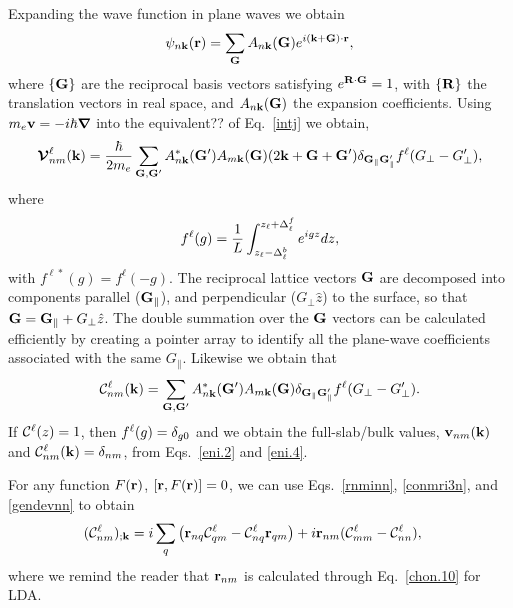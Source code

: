 \documentclass[floatfix,prb,aps,superscriptaddress,11pt,preprint,letterpaper]{revtex4}
\begin{document}
Expanding the wave function in plane waves we obtain
\begin{align}\label{eni.1}
\psi_{n\mathbf{k}}(\mathbf{r})=\sum_{\mathbf{G}} A_{n\mathbf{k}}(\mathbf{G})e^{i(\mathbf{k}+\mathbf{G})\cdot\mathbf{r}}
,
\end{align}
where $\{\mathbf{G}\}$ are the reciprocal basis vectors satisfying
$e^{\mathbf{R}\cdot\mathbf{G}}=1$, with $\{\mathbf{R}\}$ the translation vectors in real
space, and $A_{n\mathbf{k}}(\mathbf{G})$ {\color{red} the} expansion coefficients. Using
$m_e\mathbf{v}=-i\hbar\boldsymbol{\nabla}$ into the {\color{red} equivalent??} 
of Eq.~\eqref{intj}
we obtain,\cite{mendozaPRB06}
\begin{align}\label{eni.2}
\boldsymbol{\mathcal{\cal V}}^\ell_{nm}(\mathbf{k})=
\frac{\hbar}{2m_e}
\sum_{\mathbf{G},\mathbf{G}'} A^*_{n\mathbf{k}}(\mathbf{G}')  A_{m\mathbf{k}}(\mathbf{G})
(2\mathbf{k}+\mathbf{G}+\mathbf{G}')
\delta_{\mathbf{G}_\parallel \mathbf{G}'_\parallel}  
f^\ell(G_\perp-G'_\perp)
,
\end{align}   
where
\begin{align}\label{vnl.9}
f^\ell(g)=\frac{1}{L}\int_{z_\ell-\Delta^b_\ell}^{z_\ell+\Delta^f_\ell} e^{igz}dz  
 ,
\end{align}
with $f^{\ell*}(g)=f^\ell(-g)$. 
{\color{red} The} reciprocal lattice vectors $\mathbf{G}$ are 
decomposed into components
{\color{red} parallel ($\mathbf{G}_\parallel$), and perpendicular ($G_\perp \hat z$)} 
to the surface, so
that $\mathbf{G} = \mathbf{G}_\parallel + G_\perp\hat z$.
The double summation over the $\mathbf{G}$ vectors can be 
{\color{red} calculated efficiently} by  
creating a pointer array to identify all the plane-wave coefficients  
associated with the same $G_\parallel$.  
Likewise we obtain that
\begin{align}\label{eni.4}
{\mathbf{\cal C}}^\ell_{nm}(\mathbf{k})=
\sum_{\mathbf{G},\mathbf{G}'} A^*_{n\mathbf{k}}(\mathbf{G}')  A_{m\mathbf{k}}(\mathbf{G})
\delta_{\mathbf{G}_\parallel \mathbf{G}'_\parallel} 
f^\ell(G_\perp-G'_\perp)
.
\end{align}  
If ${\mathbf{\cal C}}^\ell(z)=1$, {\color{red} then $f^\ell(g)=\delta_{g0}$ and we 
obtain the full-slab/bulk values, 
$\mathbf{v}_{nm}(\mathbf{k})$ and ${\mathbf{\cal C}}^\ell_{nm}(\mathbf{k})=\delta_{nm}$,
from Eqs.~\eqref{eni.2} and \eqref{eni.4}}.

{\color{red} For} any function $F(\mathbf{r})$, $[\mathbf{r},F(\mathbf{r})]=0$, 
{\color{red} we can use}
Eqs.~\eqref{rnminn}, \eqref{conmri3n}, and \eqref{gendevnn} 
{\color{red} to }obtain
\begin{align} 
({\mathbf{\cal C}}^\ell_{nm})_{;\mathbf{k}}
&=
i
\sum_{q} 
 \left(\mathbf{r}_{nq}
{\mathbf{\cal C}}^\ell_{qm}
-
{\mathbf{\cal C}}^\ell_{nq}
\mathbf{r}_{qm}
\right) 
+i\mathbf{r}_{nm}({\mathbf{\cal C}}^\ell_{mm}-{\mathbf{\cal C}}^\ell_{nn}) 
,
\end{align} 
where we remind the reader that $\mathbf{r}_{nm}$ 
{\color{red} is} calculated through
Eq.~\eqref{chon.10} for LDA. 
\end{document}
